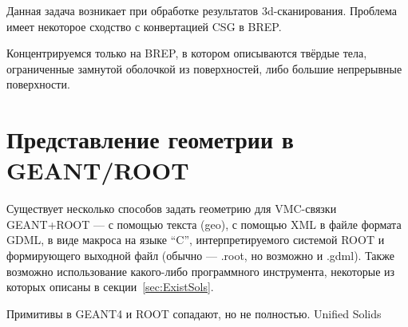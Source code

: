 
Данная задача возникает при обработке результатов 3d-сканирования.
Проблема имеет некоторое сходство с конвертацией CSG в BREP.

Концентрируемся только на BREP, в котором описываются твёрдые тела, ограниченные замнутой оболочкой из поверхностей, либо большие непрерывные поверхности.



\section{Представление геометрии в GEANT/ROOT}\label{sec:secGeoROOT}

Существует несколько способов задать геометрию для VMC-связки GEANT+ROOT --- с помощью текста (geo), с помощью XML в файле формата GDML, в виде макроса на языке ``C'', интерпретируемого системой ROOT и формирующего выходной файл (обычно --- .root, но возможно и .gdml). Также возможно использование какого-либо программного инструмента, некоторые из которых описаны в секции~\ref{sec:ExistSols}.

\todo
Примитивы в GEANT4 и ROOT сопадают, но не полностью.
Unified Solids

